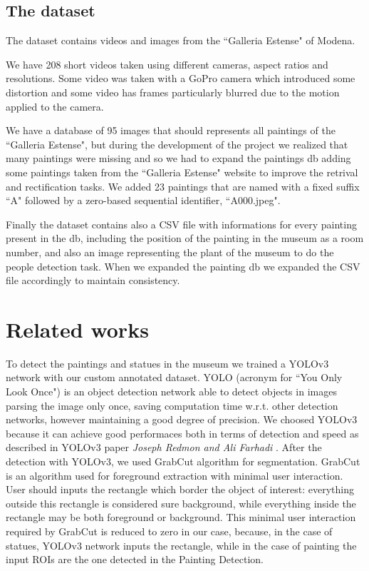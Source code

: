\documentclass[10pt,twocolumn,letterpaper]{article}
\begin{document}
\subsection{The dataset}

The dataset contains videos and images from the ``Galleria Estense" of Modena.

We have 208 short videos taken using different cameras, aspect ratios and resolutions. 
Some video was taken with a GoPro camera which introduced some distortion and
some video has frames particularly blurred due to the motion applied to the camera.

We have a database of 95 images that should represents all paintings of the ``Galleria Estense", 
but during the development of the project we realized that many paintings were missing 
and so we had to expand the paintings db adding some paintings taken from the ``Galleria Estense" 
website to improve the retrival and rectification tasks. We added 23 paintings that are named 
with a fixed suffix ``A" followed by a zero-based sequential identifier, \eg ``A000.jpeg".

Finally the dataset contains also a CSV file with informations for every painting present
in the db, including the position of the painting in the museum as a room number, and also an image
representing the plant of the museum to do the people detection task. When we expanded the 
painting db we expanded the CSV file accordingly to maintain consistency.

\section{Related works}

To detect the paintings and statues in the museum we trained a YOLOv3 network with
our custom annotated dataset. YOLO (acronym for ``You Only Look Once") is an object detection
network able to detect objects in images parsing the image only once, saving computation time w.r.t. 
other detection networks, however maintaining a good degree of precision.
We choosed YOLOv3 because it can achieve good performaces
both in terms of detection and speed as described in YOLOv3 paper \textit{Joseph Redmon and Ali Farhadi} \cite{yolov3}.
After the detection with YOLOv3, we used GrabCut algorithm for segmentation.
GrabCut is an algorithm used for foreground extraction with minimal user interaction.
User should inputs the rectangle which border the object of interest: everything outside this rectangle is considered sure background, while everything inside the rectangle may be both foreground or background.
This minimal user interaction required by GrabCut is reduced to zero in our case, because, in the case of statues, YOLOv3 network inputs the rectangle, while in the case of painting the input ROIs are the one detected in the Painting Detection.
\end{document}
